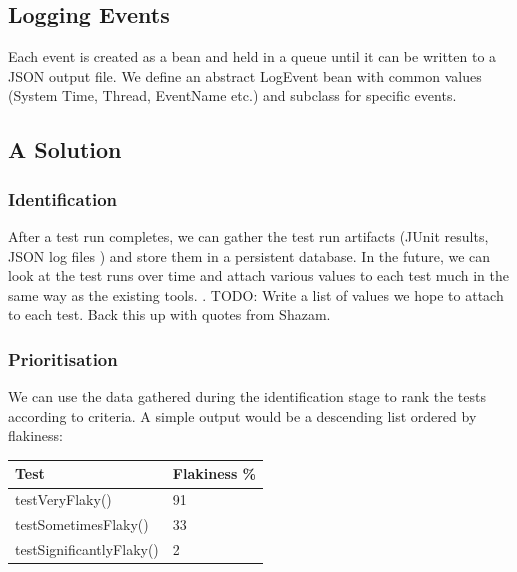 \subsection{Logging Events}

Each event is created as a bean and held in a queue until it can be written to a JSON output file. We define an abstract LogEvent bean with common values (System Time, Thread, EventName etc.) and subclass for specific events.



\subsection{A Solution}

\subsubsection{Identification}

After a test run completes, we can gather the test run artifacts (JUnit results, \heisentest{} JSON log files \etc) and store them in a persistent database. In the future, we can look at the test runs over time and attach various values to each test much in the same way as the existing tools. .
TODO: Write a list of values we hope to attach to each test. Back this up with quotes from Shazam.

\subsubsection{Prioritisation}

We can use the data gathered during the identification stage to rank the tests according to criteria. A simple output would be a descending list ordered by flakiness:

\begin{center}
    \begin{tabular}{ | l | p{5cm} |}
    \hline
    Test & Flakiness \% \\ \hline
    testVeryFlaky() & 91 \\ \hline
    testSometimesFlaky() & 33 \\ \hline
    testSignificantlyFlaky() & 2 \\ \hline
    \end{tabular}
\end{center}

